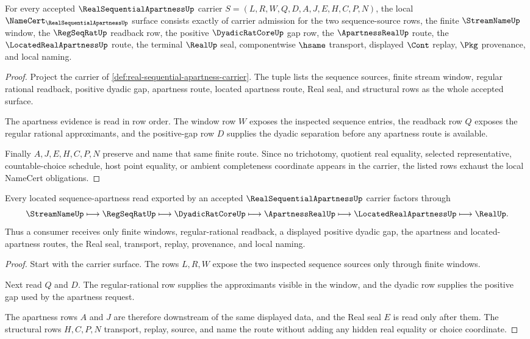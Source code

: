 \begin{theorem}\label{thm:real-sequential-apartness-namecert-obligations}
For every accepted $\RealSequentialApartnessUp$ carrier $S=(L,R,W,Q,D,A,J,E,H,C,P,N)$, the local $\NameCert_{\RealSequentialApartnessUp}$ surface consists exactly of carrier admission for the two sequence-source rows, the finite $\StreamNameUp$ window, the $\RegSeqRatUp$ readback row, the positive $\DyadicRatCoreUp$ gap row, the $\ApartnessRealUp$ route, the $\LocatedRealApartnessUp$ route, the terminal $\RealUp$ seal, componentwise $\hsame$ transport, displayed $\Cont$ replay, $\Pkg$ provenance, and local naming.
\end{theorem}
\begin{proof}
Project the carrier of \autoref{def:real-sequential-apartness-carrier}. The tuple lists the sequence sources, finite stream window, regular rational readback, positive dyadic gap, apartness route, located apartness route, Real seal, and structural rows as the whole accepted surface.

The apartness evidence is read in row order. The window row $W$ exposes the inspected sequence entries, the readback row $Q$ exposes the regular rational approximants, and the positive-gap row $D$ supplies the dyadic separation before any apartness route is available.

Finally $A,J,E,H,C,P,N$ preserve and name that same finite route. Since no trichotomy, quotient real equality, selected representative, countable-choice schedule, host point equality, or ambient completeness coordinate appears in the carrier, the listed rows exhaust the local NameCert obligations.
\end{proof}

\begin{theorem}\label{thm:real-sequential-apartness-regseqrat-located-bridge}
Every located sequence-apartness read exported by an accepted $\RealSequentialApartnessUp$ carrier factors through
$$
\StreamNameUp
\longmapsto
\RegSeqRatUp
\longmapsto
\DyadicRatCoreUp
\longmapsto
\ApartnessRealUp
\longmapsto
\LocatedRealApartnessUp
\longmapsto
\RealUp .
$$
Thus a consumer receives only finite windows, regular-rational readback, a displayed positive dyadic gap, the apartness and located-apartness routes, the Real seal, transport, replay, provenance, and local naming.
\end{theorem}
\begin{proof}
Start with the carrier surface. The rows $L,R,W$ expose the two inspected sequence sources only through finite windows.

Next read $Q$ and $D$. The regular-rational row supplies the approximants visible in the window, and the dyadic row supplies the positive gap used by the apartness request.

The apartness rows $A$ and $J$ are therefore downstream of the same displayed data, and the Real seal $E$ is read only after them. The structural rows $H,C,P,N$ transport, replay, source, and name the route without adding any hidden real equality or choice coordinate.
\end{proof}

